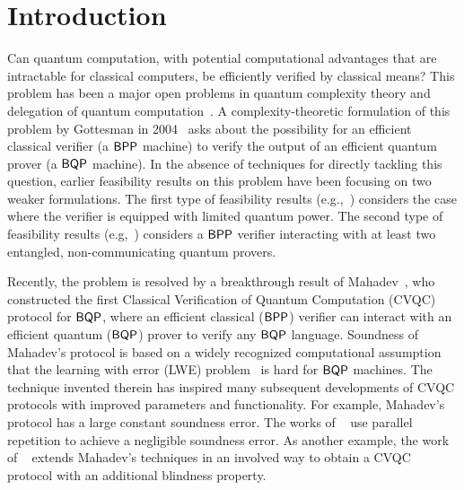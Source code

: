 \section{Introduction}

Can quantum computation, with potential computational advantages that are intractable for classical computers,
be efficiently verified by classical means?
This problem has been a major open problems in quantum complexity theory and delegation of quantum computation~\cite{web:Aaronson}. A complexity-theoretic formulation of this problem by Gottesman in 2004~\cite{web:Aaronson} asks about the possibility for an efficient classical verifier (a $\operatorname{\mathsf{BPP}}$ machine) to verify the output of an
efficient quantum prover (a $\operatorname{\mathsf{BQP}}$ machine).
In the absence of techniques for directly tackling this question, earlier feasibility results on this problem have been focusing on two weaker formulations.
The first type of feasibility results (e.g.,~\cite{BFK09,arXiv:ABOEM17,FK17,mf16}) considers the case where the verifier is equipped with limited quantum power.
The second type of feasibility results (e.g,~\cite{Nat:RUV13, CGJV19, Gheorghiu_2015, HPF15})
considers a $\operatorname{\mathsf{BPP}}$ verifier interacting with at least two entangled, non-communicating quantum provers.

Recently, the problem is resolved by a breakthrough result of Mahadev~\cite{FOCS:Mahadev18a}, who constructed the first Classical Verification of Quantum Computation (CVQC) protocol for $\operatorname{\mathsf{BQP}}$, where an efficient classical ($\operatorname{\mathsf{BPP}}$) verifier can interact with an efficient quantum ($\operatorname{\mathsf{BQP}}$) prover to verify any $\operatorname{\mathsf{BQP}}$ language. Soundness of Mahadev's protocol  is based on a widely recognized computational assumption that the learning with error (LWE) problem~\cite{JACM:Regev09} is hard for $\operatorname{\mathsf{BQP}}$ machines.
The technique invented therein has inspired many subsequent developments of CVQC protocols with improved parameters and functionality. For example, Mahadev's protocol has a large constant soundness error. The works of ~\cite{arXiv:AlaChiHun19,arXiv:ChiaChungYam19} use parallel repetition to achieve a negligible soundness error. As another example, the work of ~\cite{FOCS:GheVid19} extends Mahadev's techniques in an involved way to obtain a CVQC protocol with an additional blindness property.  


